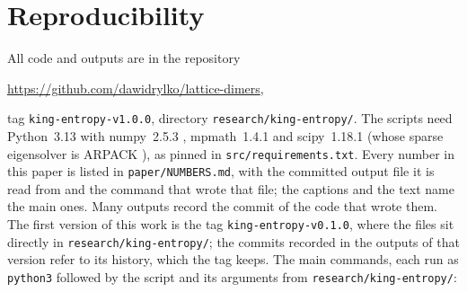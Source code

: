 \documentclass[11pt]{amsart}
\theoremstyle{definition}
\theoremstyle{remark}
\newcommand{\file}[1]{\texttt{#1}}
\begin{document}
\section{Reproducibility}\label{sec:repro}
All code and outputs are in the repository
\begin{center}
\url{https://github.com/dawidrylko/lattice-dimers},
\end{center}
tag \texttt{king-entropy-v1.0.0}, directory \texttt{research/king-entropy/}. The scripts need
Python~3.13 with numpy~2.5.3 \cite{numpy2020}, mpmath~1.4.1 \cite{mpmath} and scipy~1.18.1
\cite{scipy2020} (whose sparse eigensolver is ARPACK \cite{arpack1998}), as pinned in
\file{src/requirements.txt}. Every number in this paper is listed in \file{paper/NUMBERS.md},
with the committed output file it is read from and the command that wrote that file; the captions
and the text name the main ones. Many outputs record the commit of the code that wrote them. The
first version of this work is the tag \texttt{king-entropy-v0.1.0}, where the files sit directly in
\texttt{research/king-entropy/}; the commits recorded in the outputs of that version refer to its
history, which the tag keeps. The main commands, each run as \texttt{python3} followed by the script
and its arguments from \texttt{research/king-entropy/}:
\end{document}
